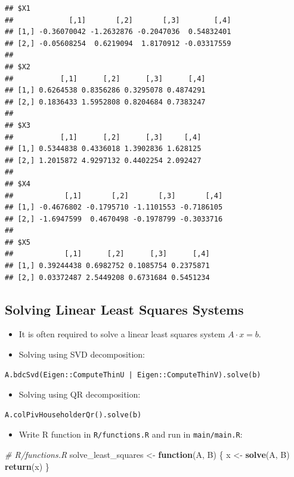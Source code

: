 \documentclass[]{book}
\newenvironment{Shaded}{\begin{snugshade}}{\end{snugshade}}
\newcommand{\KeywordTok}[1]{\textcolor[rgb]{0.13,0.29,0.53}{\textbf{#1}}}
\newcommand{\StringTok}[1]{\textcolor[rgb]{0.31,0.60,0.02}{#1}}
\newcommand{\CommentTok}[1]{\textcolor[rgb]{0.56,0.35,0.01}{\textit{#1}}}
\newcommand{\ControlFlowTok}[1]{\textcolor[rgb]{0.13,0.29,0.53}{\textbf{#1}}}
\newcommand{\NormalTok}[1]{#1}
\providecommand{\tightlist}{%
  \setlength{\itemsep}{0pt}\setlength{\parskip}{0pt}}
\begin{document}
\begin{verbatim}
## $X1
##             [,1]       [,2]       [,3]        [,4]
## [1,] -0.36070042 -1.2632876 -0.2047036  0.54832401
## [2,] -0.05608254  0.6219094  1.8170912 -0.03317559
## 
## $X2
##           [,1]      [,2]      [,3]      [,4]
## [1,] 0.6264538 0.8356286 0.3295078 0.4874291
## [2,] 0.1836433 1.5952808 0.8204684 0.7383247
## 
## $X3
##           [,1]      [,2]      [,3]     [,4]
## [1,] 0.5344838 0.4336018 1.3902836 1.628125
## [2,] 1.2015872 4.9297132 0.4402254 2.092427
## 
## $X4
##            [,1]       [,2]       [,3]       [,4]
## [1,] -0.4676802 -0.1795710 -1.1101553 -0.7186105
## [2,] -1.6947599  0.4670498 -0.1978799 -0.3033716
## 
## $X5
##            [,1]      [,2]      [,3]      [,4]
## [1,] 0.39244438 0.6982752 0.1085754 0.2375871
## [2,] 0.03372487 2.5449208 0.6731684 0.5451234
\end{verbatim}

\subsection{Solving Linear Least Squares
Systems}\label{solving-linear-least-squares-systems}

\begin{itemize}
\tightlist
\item
  It is often required to solve a linear least squares system
  \(A \cdot x = b\).
\item
  Solving using SVD decomposition:
\end{itemize}

\begin{verbatim}
A.bdcSvd(Eigen::ComputeThinU | Eigen::ComputeThinV).solve(b)
\end{verbatim}

\begin{itemize}
\tightlist
\item
  Solving using QR decomposition:
\end{itemize}

\begin{verbatim}
A.colPivHouseholderQr().solve(b)
\end{verbatim}

\begin{itemize}
\tightlist
\item
  Write R function in \texttt{R/functions.R} and run in
  \texttt{main/main.R}:
\end{itemize}

\begin{Shaded}
\begin{Highlighting}[]
\CommentTok{# R/functions.R}
\NormalTok{solve_least_squares <-}
\StringTok{  }\ControlFlowTok{function}\NormalTok{(A, B) \{}
\NormalTok{    x <-}\StringTok{ }\KeywordTok{solve}\NormalTok{(A, B)}
    \KeywordTok{return}\NormalTok{(x)}
\NormalTok{  \}}
\end{Highlighting}
\end{Shaded}
\end{document}

